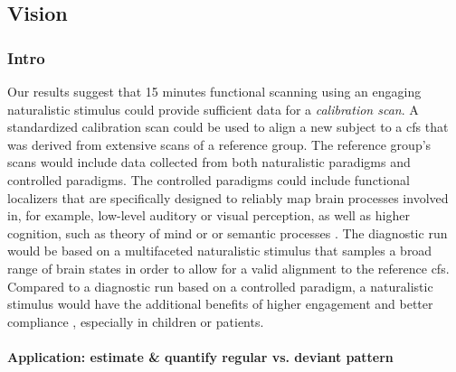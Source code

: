 \subsection{Vision}





\subsubsection{Intro}


%
Our results suggest that 15 minutes functional scanning using an engaging
naturalistic stimulus could provide sufficient data for a \textit{calibration
scan}.
%
A standardized calibration scan could be used to align a new subject to a
\ac{cfs} that was derived from extensive scans of a reference group.
%
The reference group's scans would include data collected from both naturalistic
paradigms and controlled paradigms.
%
The controlled paradigms could include functional localizers that are
specifically designed to reliably map brain processes involved in, for example,
low-level auditory or visual perception, as well as higher cognition, such as
theory of mind or \citep{spunt2014validating} or semantic processes
\citep{fedorenko2010new, fernandez2001language}.
%
The diagnostic run would be based on a multifaceted naturalistic stimulus that
samples a broad range of brain states in order to allow for a valid alignment to
the reference \ac{cfs}.
%
Compared to a diagnostic run based on a controlled paradigm, a naturalistic
stimulus would have the additional benefits of higher engagement and better
compliance \citep{vanderwal2015inscapes, eickhoff2020towards}, especially in
children or patients.


\paragraph{Application: estimate \& quantify regular vs. deviant pattern}

